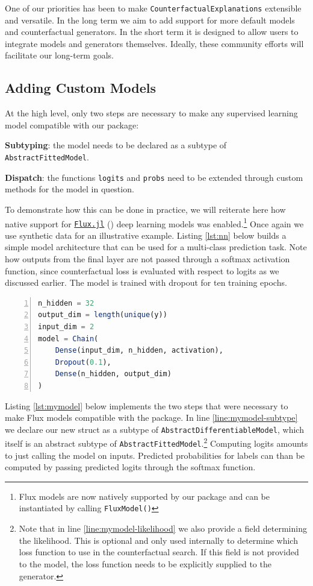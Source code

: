 \documentclass[
  letterpaper,
  DIV=11,
  numbers=noendperiod]{scrartcl}
\begin{document}
One of our priorities has been to make
\texttt{CounterfactualExplanations} extensible and versatile. In the
long term we aim to add support for more default models and
counterfactual generators. In the short term it is designed to allow
users to integrate models and generators themselves. Ideally, these
community efforts will facilitate our long-term goals.

\hypertarget{sec-custom-mod}{%
\subsection{Adding Custom Models}\label{sec-custom-mod}}

At the high level, only two steps are necessary to make any supervised
learning model compatible with our package:

\begin{unnumlist}
\item \textbf{Subtyping}: the model needs to be declared as a subtype of \texttt{AbstractFittedModel}.
\item \textbf{Dispatch}: the functions \texttt{logits} and \texttt{probs} need to be extended through custom methods for the model in question.
\end{unnumlist}

To demonstrate how this can be done in practice, we will reiterate here
how native support for \href{https://fluxml.ai/}{\texttt{Flux.jl}}
(\cite{innes2018flux}) deep learning models was enabled.\footnote{Flux
  models are now natively supported by our package and can be
  instantiated by calling \texttt{FluxModel()}} Once again we use
synthetic data for an illustrative example. Listing \ref{lst:nn} below
builds a simple model architecture that can be used for a multi-class
prediction task. Note how outputs from the final layer are not passed
through a softmax activation function, since counterfactual loss is
evaluated with respect to logits as we discussed earlier. The model is
trained with dropout for ten training epochs.

\begin{lstlisting}[language=Julia, escapechar=@, numbers=left, label={lst:nn}, caption={}]
n_hidden = 32
output_dim = length(unique(y))
input_dim = 2
model = Chain(
    Dense(input_dim, n_hidden, activation),
    Dropout(0.1),
    Dense(n_hidden, output_dim)
)  
\end{lstlisting}

Listing \ref{lst:mymodel} below implements the two steps that were
necessary to make Flux models compatible with the package. In line
\ref{line:mymodel-subtype} we declare our new struct as a subtype of
\texttt{AbstractDifferentiableModel}, which itself is an abstract
subtype of \texttt{AbstractFittedModel}.\footnote{Note that in line
  \ref{line:mymodel-likelihood} we also provide a field determining the
  likelihood. This is optional and only used internally to determine
  which loss function to use in the counterfactual search. If this field
  is not provided to the model, the loss function needs to be explicitly
  supplied to the generator.} Computing logits amounts to just calling
the model on inputs. Predicted probabilities for labels can than be
computed by passing predicted logits through the softmax function.
\end{document}
